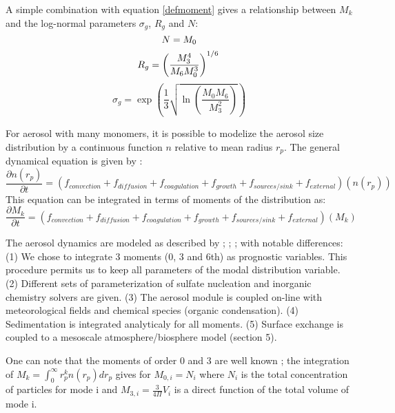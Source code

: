 A simple combination with equation \ref{defmoment} gives a relationship between 
$M_k$ and the log-normal parameters $\sigma_g$, $R_g$ and $N$:
\begin{equation}
N = M_0 \\
\label{number}
\end{equation}
\begin{equation}
R_g = \left( \frac{M_3^4}{M_6 M_0^3} \right)^{1/6} \\
\label{radius}
\end{equation}
\begin{equation}
\sigma_g = \exp \left( \frac{1}{3} \sqrt{\ln \left( \frac{M_0 M_6}{M_3^2} 
\right)} \right)
\label{sigma}
\end{equation}


For aerosol with many monomers, it is possible to modelize the aerosol size 
distribution by 
a continuous function $n$ relative to mean radius $r_p$. The general dynamical 
equation is given by \citet{Friedlander-1977}:
\begin{equation}
\frac{\partial n(r_p)}{\partial t} = (f_{convection} + f_{diffusion} + 
f_{coagulation} +
f_{growth} + f_{sources/sink} + f_{external})(n(r_p))
\label{GDE}
\end{equation}
This equation can be integrated in terms of moments of the distribution as:
\begin{equation}
\frac{\partial M_k}{\partial t} = (f_{convection} + f_{diffusion} + 
f_{coagulation} +
f_{growth} + f_{sources/sink} + f_{external})(M_k)
\label{GDE_M}
\end{equation}

The aerosol dynamics are modeled  as described by \citet{Whitby-1991}; 
\citet{Binkowski-1995}; \citet{Ackermann-1998}; \citet{Binkowski-2003} 
with notable differences: (1) We chose to integrate 3 moments (0, 3 and 6th) as 
prognostic variables. This
procedure permits us to keep all parameters of the modal distribution variable.
(2) Different sets of parameterization of sulfate nucleation and inorganic 
chemistry solvers are given.
(3) The aerosol module is coupled on-line with meteorological fields and chemical 
species (organic condensation).
(4) Sedimentation is integrated analyticaly for all moments.
(5) Surface exchange is coupled to a mesoscale 
atmosphere/biosphere model (section 5).

One can note that the moments of order 0 and 3 are well known ; the integration 
of $M_k = \int_{0}^{\infty} r_{p}^{k} n(r_p) dr_p$ gives for $M_{0,i}=N_i$ where 
$N_i$ is the total concentration of particles for mode i and $M_{3,i}= 
\frac{3}{4 \Pi} V_i$  is a direct function of the total volume of mode i.


